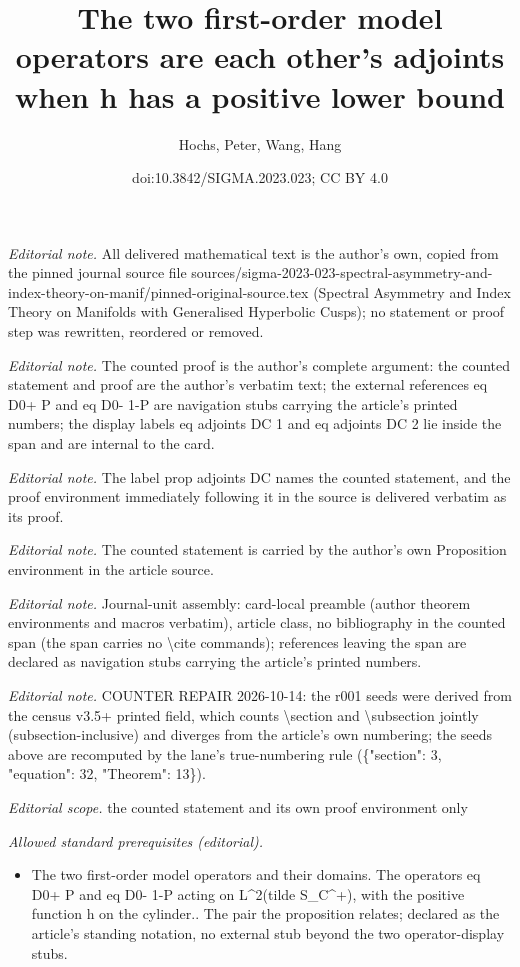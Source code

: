 \documentclass[10pt,a4paper]{article}
\title{The two first-order model operators are each other's adjoints when h has a positive lower bound}
\author{Hochs, Peter, Wang, Hang}
\date{doi:10.3842/SIGMA.2023.023; CC BY 4.0}
\numberwithin{equation}{section}
\begin{document}
\maketitle
\setcounter{section}{3}
\setcounter{equation}{32}
\setcounter{Theorem}{13}
\noindent\textit{Editorial note.} All delivered mathematical text is the author's own, copied from the pinned journal source file sources/sigma-2023-023-spectral-asymmetry-and-index-theory-on-manif/pinned-original-source.tex (Spectral Asymmetry and Index Theory on Manifolds with Generalised Hyperbolic Cusps); no statement or proof step was rewritten, reordered or removed.\par\medskip
\noindent\textit{Editorial note.} The counted proof is the author's complete argument: the counted statement and proof are the author's verbatim text; the external references eq D0+ P and eq D0- 1-P are navigation stubs carrying the article's printed numbers; the display labels eq adjoints DC 1 and eq adjoints DC 2 lie inside the span and are internal to the card.\par\medskip
\noindent\textit{Editorial note.} The label prop adjoints DC names the counted statement, and the proof environment immediately following it in the source is delivered verbatim as its proof.\par\medskip
\noindent\textit{Editorial note.} The counted statement is carried by the author's own Proposition environment in the article source.\par\medskip
\noindent\textit{Editorial note.} Journal-unit assembly: card-local preamble (author theorem environments and macros verbatim), article class, no bibliography in the counted span (the span carries no \textbackslash{}cite commands); references leaving the span are declared as navigation stubs carrying the article's printed numbers.\par\medskip
\noindent\textit{Editorial note.} COUNTER REPAIR 2026-10-14: the r001 seeds were derived from the census v3.5+ printed field, which counts \textbackslash{}section and \textbackslash{}subsection jointly (subsection-inclusive) and diverges from the article's own numbering; the seeds above are recomputed by the lane's true-numbering rule (\{"section": 3, "equation": 32, "Theorem": 13\}).\par\medskip
\noindent\textit{Editorial scope.} the counted statement and its own proof environment only\par\medskip
\noindent\textit{Allowed standard prerequisites (editorial).}\begin{itemize}
\item The two first-order model operators and their domains. The operators eq D0+ P and eq D0- 1-P acting on L\textasciicircum{}2(tilde S\_C\textasciicircum{}+), with the positive function h on the cylinder.. The pair the proposition relates; declared as the article's standing notation, no external stub beyond the two operator-display stubs.
\end{itemize}\medskip
\end{document}
